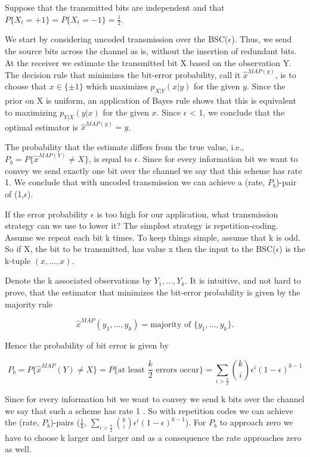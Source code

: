 \begin{example}
Suppose that the transmitted bits are independent and that $P \{X_t = +1\} = P \{ X_t = -1\} = \frac{1}{2}$. 

We start by considering uncoded transmission over the BSC($\epsilon$). Thus, we send the source bits across the channel as is, without the insertion
of redundant bits. At the receiver we estimate the transmitted bit X based on the observation Y. The decision rule that minimizes the
bit-error probability, call it $\hat{x}^{MAP(y)}$, is to choose that $x \in \{\pm 1\}$ which maximizes $p_{X|Y}(x|y)$ for the given $y$. Since the prior on X is uniform, an application of Bayes
rule shows that this is equivalent to maximizing $p_{Y|X}(y|x)$ for the given $x$. Since
$\epsilon$ < 1, we conclude that the optimal estimator is $\hat{x}^{MAP(y)} = y$.

The probability that the estimate differs from the true value, i.e., $P_b = P \{\hat{x}^{MAP(Y)} \neq X\}$, is equal to $\epsilon$. Since
for every information bit we want to convey we send exactly one bit over the channel
we say that this scheme has rate 1. We conclude that with uncoded transmission we
can achieve a (rate, $P_b$)-pair of (1,$\epsilon$).
\end{example}

\begin{example}

If the error probability $\epsilon$ is too high for our application, what transmission strategy can we use to lower it? The simplest strategy is repetition-coding.
Assume we repeat each bit k times. To keep things simple, assume that k is odd. So if X, the bit to be transmitted, has value x then the input to the BSC($\epsilon$) is the k-tuple
$(x, \dots, x)$.

Denote the k associated observations by $Y_1, \dots, Y_k$. It is intuitive, and not hard to prove, that the estimator that minimizes the bit-error probability is given by the
majority rule

\begin{equation}
	\hat{x}^{MAP}(y_1, \dots, y_k) = \text{majority of } \{y_1, \dots, y_k \}.
\end{equation}

Hence the probability of bit error is given by

\begin{equation}
	P_b = P \{\hat{x}^{MAP}(Y) \neq X\}  = P\{\text{at least } \frac{k}{2} \text{ errors occur} \} = \sum_{i>\frac{k}{2}} \binom{k}{i}\epsilon^i (1-\epsilon)^{k-1}
\end{equation}

Since for every information bit we want to convey we send k bits over the channel we say that such a scheme has rate 1 . So with repetition codes we can achieve
the (rate, $P_b$)-pairs ($\frac{1}{k}$, $\sum_{i>\frac{k}{2}}\binom{k}{i}\epsilon^i (1-\epsilon)^{k-1}$). For $P_b$ to approach zero we have to
choose k larger and larger and as a consequence the rate approaches zero as well.
\end{example}


